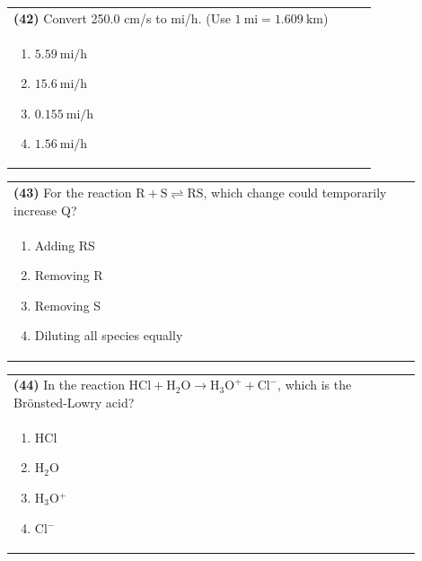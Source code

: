 \documentclass{article}
\begin{document}
\noindent\begin{tabular}{|p{0.9\linewidth}|}
\hline
\textbf{(42)} Convert 250.0 cm/s to mi/h. (Use $1~\text{mi}=1.609~\text{km}$) \\
\begin{minipage}[t]{0.85\linewidth}
\begin{enumerate}[label=\alph*.]
    \item $5.59~\text{mi/h}$
    \item $15.6~\text{mi/h}$
    \item $0.155~\text{mi/h}$
    \item $1.56~\text{mi/h}$
\end{enumerate}
\end{minipage}\\[0.2cm]
\hline
\end{tabular}

\noindent\begin{tabular}{|p{0.9\linewidth}|}
\hline
\textbf{(43)} For the reaction $\text{R} + \text{S} \rightleftharpoons \text{RS}$, which change could temporarily increase Q?\\[0.2cm]
\begin{minipage}[t]{0.85\linewidth}
\begin{enumerate}[label=\alph*.]
\item Adding RS
\item Removing R
\item Removing S
\item Diluting all species equally
\end{enumerate}
\end{minipage}\\[0.2cm]
\hline
\end{tabular}

\noindent\begin{tabular}{|p{0.9\linewidth}|}
\hline
\textbf{(44)} In the reaction $\text{HCl} + \text{H}_2\text{O} \rightarrow \text{H}_3\text{O}^+ + \text{Cl}^-$, which is the Brönsted-Lowry acid?\\[0.2cm]
\begin{minipage}[t]{0.85\linewidth}
\begin{enumerate}[label=\alph*.]
\item HCl
\item H$_2$O
\item H$_3$O$^+$
\item Cl$^-$
\end{enumerate}
\end{minipage}\\[0.2cm]
\hline
\end{tabular}
\end{document}

